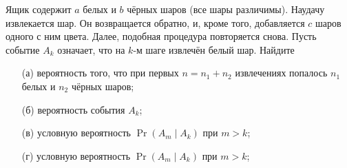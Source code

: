 \begin{problem}
    Ящик содержит \(a\) белых и \(b\) чёрных шаров (все шары различимы). Наудачу извлекается шар. Он возвращается обратно, и, кроме того, добавляется \(c\) шаров одного с ним цвета. Далее, подобная процедура повторяется снова. Пусть событие \(A_k\) означает, что на \(k\)-м шаге извлечён белый шар. Найдите
    \begin{enumerate}
        \item[(а)] вероятность того, что при первых \(n = n_1 + n_2\) извлечениях попалось \(n_1\) белых и \(n_2\) чёрных шаров;
        \item[(б)] вероятность события \(A_k\);
        \item[(в)] условную вероятность \(\Pr(A_m \mid A_k)\) при \(m > k\);
        \item[(г)] условную вероятность \(\Pr(A_m \mid A_k)\) при \(m > k\);
    \end{enumerate}
\end{problem}
